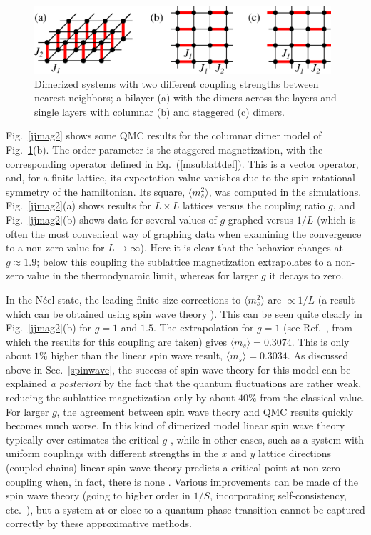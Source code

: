\documentclass[draft,numberedheadings]{aipproc}
\begin{document}
\begin{figure}
\includegraphics[width=11cm, clip]{dlattices.eps}
\caption{Dimerized systems with two different coupling strengths between nearest neighbors; a bilayer (a) with the dimers across the layers and
single layers with columnar (b) and staggered (c) dimers.}
\label{dlattices}
\end{figure}

Fig.~\ref{jjmag2} shows some QMC results for the columnar dimer model of Fig.~\ref{dlattices}(b). The order parameter is the staggered magnetization, 
with the corresponding operator defined in Eq.~(\ref{msublattdef}). This is a vector operator, and, for a finite lattice, its expectation value vanishes due 
to the spin-rotational symmetry of the hamiltonian. Its square, $\langle m_s^2\rangle$, was computed in the simulations. Fig.~\ref{jjmag2}(a) shows results 
for $L\times L$ lattices versus the coupling ratio $g$, and Fig.~\ref{jjmag2}(b) shows data for several values of $g$ graphed versus $1/L$ (which is often 
the most convenient way of graphing data when examining the convergence to a non-zero value for $L \to \infty$). Here it is clear that the behavior changes 
at $g\approx 1.9$; below this coupling the sublattice magnetization extrapolates to a non-zero value in the thermodynamic limit, whereas for larger $g$ 
it decays to zero. 

In the N\'eel state, the leading finite-size corrections 
to $\langle m^2_s\rangle$ are $\propto 1/L$ (a result which can be obtained using spin wave theory \cite{huse,reger88}). 
This can be seen quite clearly in Fig.~\ref{jjmag2}(b) for $g=1$ and $1.5$. The extrapolation for $g=1$ (see Ref.~\cite{awshg}, from which the results for
this coupling are taken) gives $\langle m_s\rangle= 0.3074$. This is only about $1\%$ higher than the linear spin wave result, $\langle m_s\rangle = 0.3034$. 
As discussed above in Sec.~\ref{spinwave}, the success of spin wave theory for this model can be explained {\it a posteriori} by the fact that the quantum 
fluctuations are rather weak, reducing the sublattice magnetization only by about $40\%$ from the classical value. For larger $g$, the agreement between
spin wave theory and QMC results quickly becomes much worse. In this kind of dimerized model linear spin wave theory typically over-estimates the critical 
$g$ \cite{monienbilayer,awsbilayer,morr}, while in other cases, such as a system with uniform couplings with different strengths in the $x$ and $y$ lattice 
directions (coupled chains) linear spin wave theory predicts a critical point at non-zero coupling when, in fact, there is none \cite{mchains}. 
Various improvements can be made of the spin wave theory (going to higher order in $1/S$, incorporating self-consistency, 
etc.~\cite{manousakis,canali,hamer,monienbilayer,morr,shevchenko}), but a system at or close to a quantum phase transition cannot be captured correctly 
by these approximative methods.
\end{document}
